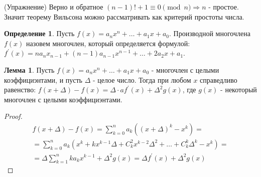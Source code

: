 \documentclass[a4paper, 12pt]{article}
\theoremstyle{definition}
\newtheorem{definition}{Определение}[section]
\newtheorem{lemma}{Лемма}[section]
\begin{document}
    (Упражнение) Верно и обратное $(n-1)!+1\equiv 0\pmod{n} \Rightarrow n$ - простое.\\
    Значит теорему Вильсона можно рассматривать как критерий простоты числа.
    \begin{definition}
        Пусть $f(x)=a_n x^n+\dots+a_1 x+a_0$. Производной многочлена $f(x)$ назовем многочлен, который определяется формулой:\\
        $f^{\prime}(x)=na_n x_{n-1}+(n-1)a_{n-1}x^{n-1}+\dots+2a_2x+a_1$. 
    \end{definition} 
    \begin{lemma}\label{lemma9.1}
        Пусть $f(x)=a_nx^n+ \dots +a_1 x+a_0$ - многочлен с целыми коэффициэнтами, и пусть $\Delta$ - целое число. Тогда при любом $x$ справедливо равенство: $f(x+\Delta)-f(x)=\Delta\cdot a f^{\prime}(x)+\Delta^2g(x)$, где $g(x)$ - некоторый многочлен с целыми коэффициэнтами.
    \end{lemma} 
    \begin{proof}
        \begin{multline*}
            f(x+\Delta)-f(x)=\sum\limits_{k=0}^{n}a_k((x+\Delta)^k-x^k)=\\
            =\sum\limits_{k=0}^{n}a_k(x^k+kx^{k-1}\Delta+C_k^2 x^{k-2}\Delta^2+ \dots + C_k^k \Delta^k-x^k)=\\
            =\Delta \sum\limits_{k=1}^{n} k a_k x^{k-1}+\Delta^2 g(x)=\Delta f^{\prime}(x)+\Delta^2g(x)
        \end{multline*}
    \end{proof}
\end{document}
